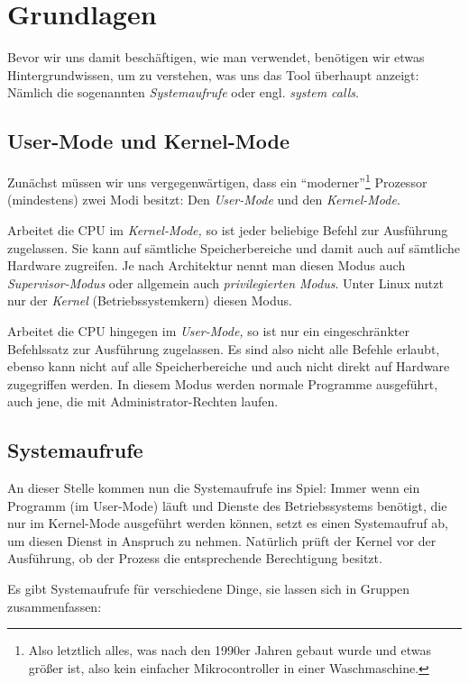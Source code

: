 \section{Grundlagen}

Bevor wir uns damit beschäftigen, wie man \strace{} verwendet, benötigen wir etwas
Hintergrundwissen, um zu verstehen, was uns das Tool überhaupt anzeigt: Nämlich die sogenannten
\emph{Systemaufrufe} oder engl. \emph{system calls}.

\subsection{User-Mode und Kernel-Mode}

Zunächst müssen wir uns vergegenwärtigen, dass ein "`moderner"'\footnote{Also letztlich alles, was
nach den 1990er Jahren gebaut wurde und etwas größer ist, also kein einfacher Mikrocontroller in
einer Waschmaschine.} Prozessor (mindestens) zwei Modi besitzt: Den \emph{User-Mode} und den
\emph{Kernel-Mode}.

Arbeitet die CPU im \emph{Kernel-Mode,} so ist jeder beliebige Befehl zur Ausführung zugelassen.
Sie kann auf sämtliche Speicherbereiche und damit auch auf sämtliche Hardware zugreifen. Je nach
Architektur nennt man diesen Modus auch \emph{Supervisor-Modus} oder allgemein auch
\emph{privilegierten Modus}. Unter Linux nutzt nur der \emph{Kernel} (Betriebssystemkern) diesen
Modus.

Arbeitet die CPU hingegen im \emph{User-Mode,} so ist nur ein eingeschränkter Befehlssatz zur
Ausführung zugelassen. Es sind also nicht alle Befehle erlaubt, ebenso kann nicht auf alle
Speicherbereiche und auch nicht direkt auf Hardware zugegriffen werden. In diesem Modus werden
normale Programme ausgeführt, auch jene, die mit Administrator-Rechten laufen.

\subsection{Systemaufrufe}

An dieser Stelle kommen nun die Systemaufrufe ins Spiel: Immer wenn ein Programm (im User-Mode)
läuft und Dienste des Betriebssystems benötigt, die nur im Kernel-Mode ausgeführt werden können,
setzt es einen Systemaufruf ab, um diesen Dienst in Anspruch zu nehmen. Natürlich prüft der Kernel
vor der Ausführung, ob der Prozess die entsprechende Berechtigung besitzt.

Es gibt Systemaufrufe für verschiedene Dinge, sie lassen sich in Gruppen
zusammenfassen:

